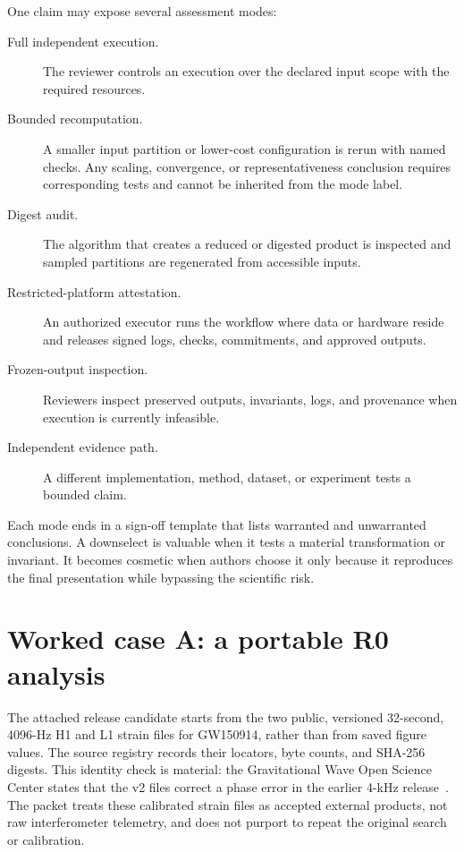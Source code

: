 \documentclass[11pt]{article}
\newcommand{\Rzero}{R0}
\begin{document}
One claim may expose several assessment modes:

\begin{description}
  \item[Full independent execution.] The reviewer controls an execution over the declared input scope with the required resources.
  \item[Bounded recomputation.] A smaller input partition or lower-cost configuration is rerun with named checks. Any scaling, convergence, or representativeness conclusion requires corresponding tests and cannot be inherited from the mode label.
  \item[Digest audit.] The algorithm that creates a reduced or digested product is inspected and sampled partitions are regenerated from accessible inputs.
  \item[Restricted-platform attestation.] An authorized executor runs the workflow where data or hardware reside and releases signed logs, checks, commitments, and approved outputs.
  \item[Frozen-output inspection.] Reviewers inspect preserved outputs, invariants, logs, and provenance when execution is currently infeasible.
  \item[Independent evidence path.] A different implementation, method, dataset, or experiment tests a bounded claim.
\end{description}

Each mode ends in a sign-off template that lists warranted and unwarranted conclusions. A downselect is valuable when it tests a material transformation or invariant. It becomes cosmetic when authors choose it only because it reproduces the final presentation while bypassing the scientific risk.

\section{Worked case A: a portable \Rzero{} analysis}
\label{sec:r0}

The attached release candidate starts from the two public, versioned 32-second, 4096-Hz H1 and L1 strain files for GW150914, rather than from saved figure values. The source registry records their locators, byte counts, and SHA-256 digests. This identity check is material: the Gravitational Wave Open Science Center states that the v2 files correct a phase error in the earlier 4-kHz release~\cite{gwosc-gw150914-data-2016}. The packet treats these calibrated strain files as accepted external products, not raw interferometer telemetry, and does not purport to repeat the original search or calibration.
\end{document}
